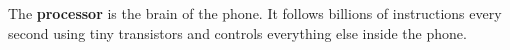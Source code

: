\sectionrule

\begin{bigidea}
  The \textbf{processor} is the brain of the phone.
  It follows billions of instructions every second using tiny transistors
  and controls everything else inside the phone.
\end{bigidea}

